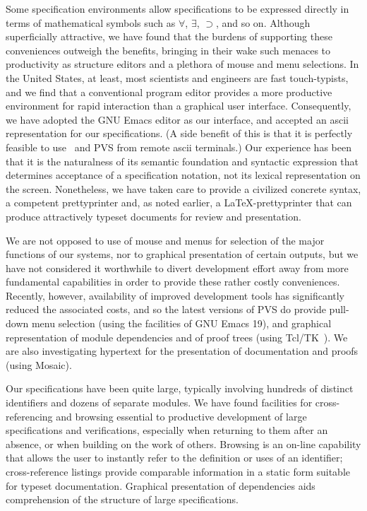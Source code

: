 Some specification environments allow specifications to be expressed
directly in terms of mathematical symbols such as $\forall $, $\exists $,
$ \supset $, and so on.  Although superficially attractive, we have found
that the burdens of supporting these conveniences outweigh the
benefits, bringing in their wake such menaces to productivity as
structure editors and a plethora of mouse and menu selections.  
In the United States, at least, most scientists and engineers are
fast touch-typists, and we find that a conventional program editor
provides a more productive environment for rapid interaction than a
graphical user interface.  Consequently, we have adopted the GNU Emacs
editor as our interface, and accepted an ascii representation for our
specifications.  (A side benefit of this is that it is perfectly
feasible to use \ehdm\ and PVS from remote ascii terminals.)
Our experience has been that it is the naturalness
of its semantic foundation and syntactic expression that determines
acceptance of a specification notation, not its lexical
representation on the screen.  Nonetheless, we have taken care to
provide a civilized concrete syntax, a competent prettyprinter and,
as noted earlier, a \LaTeX-prettyprinter that can produce
attractively typeset documents for review and presentation.

We are not opposed to use of mouse and menus for selection of the
major functions of our systems, nor to graphical presentation of
certain outputs, but we have not considered it worthwhile to divert
development effort away from more fundamental capabilities in order
to provide these rather costly conveniences.  Recently, however,
availability of improved development tools has significantly reduced
the associated costs, and so the latest versions of PVS do provide
pull-down menu selection (using the facilities of GNU Emacs 19), and
graphical representation of module dependencies and of proof trees
(using Tcl/TK~\cite{Tcl/TK}).  We are also investigating hypertext
for the presentation of documentation and proofs (using Mosaic).

Our specifications have been quite large, typically involving
hundreds of distinct identifiers and dozens of separate modules.  We
have found facilities for cross-referencing and browsing essential to
productive development of large specifications and verifications,
especially when returning to them after an absence, or when building
on the work of others.  Browsing is an on-line capability that allows
the user to instantly refer to the definition or uses of an
identifier; cross-reference listings provide comparable information in
a static form suitable for typeset documentation.  Graphical
presentation of dependencies aids comprehension of the structure of
large specifications.


